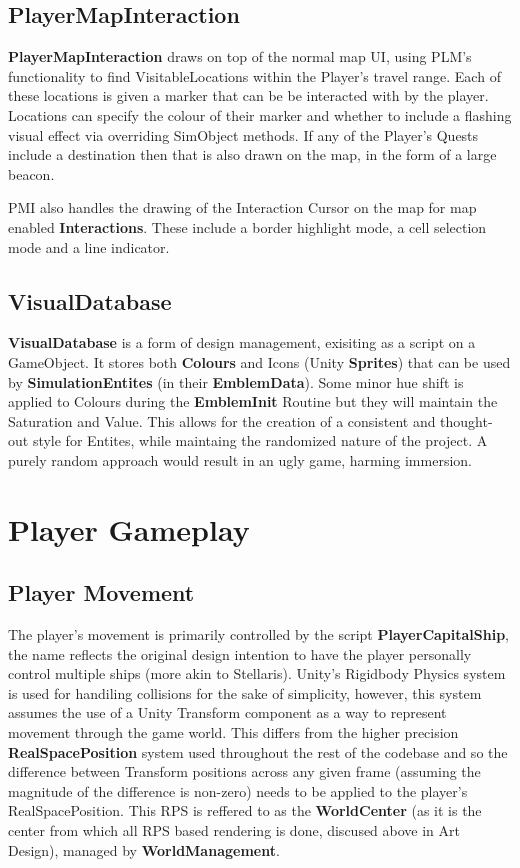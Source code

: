\documentclass{report}
\begin{document}
\subsection{PlayerMapInteraction}

\textbf{PlayerMapInteraction} draws on top of the normal map UI, using PLM's functionality to find VisitableLocations within the Player's travel range. Each of these locations is given a marker that can be be interacted with by the player. Locations can specify the colour of their marker and whether to include a flashing visual effect via overriding SimObject methods. If any of the Player's Quests include a destination then that is also drawn on the map, in the form of a large beacon.

PMI also handles the drawing of the Interaction Cursor on the map for map enabled \textbf{Interactions}. These include a border highlight mode, a cell selection mode and a line indicator.

\subsection{VisualDatabase}

\textbf{VisualDatabase} is a form of design management, exisiting as a script on a GameObject. It stores both \textbf{Colours} and Icons (Unity \textbf{Sprites}) that can be used by \textbf{SimulationEntites} (in their \textbf{EmblemData}). Some minor hue shift is applied to Colours during the \textbf{EmblemInit} Routine but they will maintain the Saturation and Value. This allows for the creation of a consistent and thought-out style for Entites, while maintaing the randomized nature of the project. A purely random approach would result in an ugly game, harming immersion.

\section{Player Gameplay}

\subsection{Player Movement}

The player's movement is primarily controlled by the script \textbf{PlayerCapitalShip}, the name reflects the original design intention to have the player personally control multiple ships (more akin to Stellaris). Unity's Rigidbody Physics system is used for handiling collisions for the sake of simplicity, however, this system assumes the use of a Unity Transform component as a way to represent movement through the game world. This differs from the higher precision \textbf{RealSpacePosition} system used throughout the rest of the codebase and so the difference between Transform positions across any given frame (assuming the magnitude of the difference is non-zero) needs to be applied to the player's RealSpacePosition. This RPS is reffered to as the \textbf{WorldCenter} (as it is the center from which all RPS based rendering is done, discused above in Art Design), managed by \textbf{WorldManagement}.
\end{document}
